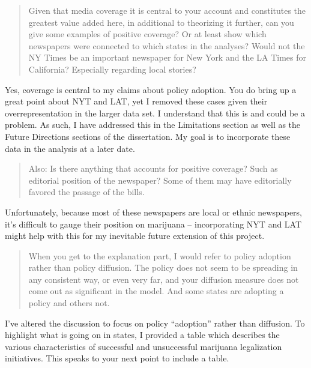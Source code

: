 \documentclass[12pt,stdletter,dateno,sigleft]{newlfm} %
\begin{document}
\begin{newlfm}
\begin{quotation}{\color{red}\noindent \footnotesize
Given that media coverage it is central to your account and constitutes the greatest value added here, in additional to theorizing it further, can you give some examples of positive coverage?  Or at least show which newspapers were connected to which states in the analyses?  Would not the NY Times be an important newspaper for New York and the LA Times for California?  Especially regarding local stories?  
}
\end{quotation}


Yes, coverage is central to my claims about policy adoption. You do bring up a great point about NYT and LAT, yet I removed these cases given their overrepresentation in the larger data set. I understand that this is and could be a problem. As such, I have addressed this in the Limitations section as well as the Future Directions sections of the dissertation. My goal is to incorporate these data in the analysis at a later date. 



\begin{quotation}{\color{red}\noindent \footnotesize
Also: Is there anything that accounts for positive coverage?  Such as editorial position of the newspaper?  Some of them may have editorially favored the passage of the bills.
}
\end{quotation}

Unfortunately, because most of these newspapers are local or ethnic newspapers, it's difficult to gauge their position on marijuana -- incorporating NYT and LAT might help with this for my inevitable future extension of this project. 


\begin{quotation}{\color{red}\noindent \footnotesize
When you get to the explanation part, I would refer to policy adoption rather than policy diffusion.  The policy does not seem to be spreading in any consistent way, or even very far, and your diffusion measure does not come out as significant in the model.  And some states are adopting a policy and others not. 
}
\end{quotation}



I've altered the discussion to focus on policy ``adoption'' rather than diffusion. To highlight what is going on in states, I provided a table which describes the various characteristics of successful and unsuccessful marijuana legalization initiatives. This speaks to your next point to include a table. 



\end{newlfm}
\end{document}
